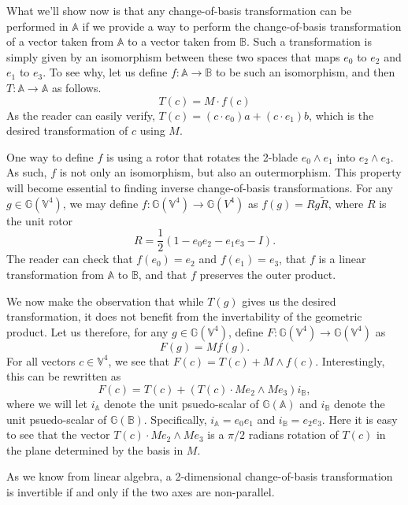 \documentclass[12pt]{article}
\newcommand{\G}{\mathbb{G}}
\newcommand{\V}{\mathbb{V}}
\newcommand{\A}{\mathbb{A}}
\newcommand{\B}{\mathbb{B}}
\begin{document}
What we'll show now is that any change-of-basis transformation can be performed
in $\A$ if we provide a way to perform the change-of-basis transformation of a vector
taken from $\A$ to a vector taken from $\B$.  Such a transformation is simply given
by an isomorphism between these two spaces that maps $e_0$ to $e_2$ and $e_1$ to $e_3$.
To see why, let us define $f:\A\to\B$ to be such an isomorphism, and then $T:\A\to\A$
as follows.
\begin{equation*}
T(c) = M\cdot f(c)
\end{equation*}
As the reader can easily verify, $T(c) = (c\cdot e_0)a + (c\cdot e_1)b$, which is the
desired transformation of $c$ using $M$.

One way to define $f$ is using a rotor that rotates the 2-blade $e_0\wedge e_1$ into $e_2\wedge e_3$.
As such, $f$ is not only an isomorphism, but also an outermorphism.  This property will become essential
to finding inverse change-of-basis transformations.  For any $g\in\G(\V^4)$, we may define
$f:\G(\V^4)\to\G(V^4)$ as
$f(g)=Rg\tilde{R}$, where $R$ is the unit rotor
\begin{equation*}
R = \frac{1}{2}\left(1-e_0e_2-e_1e_3-I\right).
\end{equation*}
The reader can check that $f(e_0)=e_2$ and $f(e_1)=e_3$, that $f$ is a linear
transformation from $\A$ to $\B$, and that $f$ preserves the outer product.

We now make the observation that while $T(g)$ gives us the desired transformation,
it does not benefit from the invertability of the geometric product.  Let us therefore,
for any $g\in\G(\V^4)$, define $F:\G(\V^4)\to\G(\V^4)$ as
\begin{equation*}
F(g) = Mf(g).
\end{equation*}
For all vectors $c\in\V^4$, we see that $F(c)=T(c) + M\wedge f(c)$.  Interestingly, this
can be rewritten as
\begin{equation*}
F(c) = T(c) + \left(T(c)\cdot Me_2\wedge Me_3\right)i_{\B},
\end{equation*}
where we will let $i_{\A}$ denote the unit psuedo-scalar of $\G(\A)$ and $i_{\B}$ denote
the unit psuedo-scalar of $\G(\B)$.  Specifically, $i_{\A}=e_0e_1$ and $i_{\B}=e_2e_3$.
Here it is easy to see that the vector $T(c)\cdot Me_2\wedge Me_3$ is a $\pi/2$ radians
rotation of $T(c)$ in the plane determined by the basis in $M$.

As we know from linear algebra, a 2-dimensional change-of-basis transformation is invertible
if and only if the two axes are non-parallel.



\end{document}
